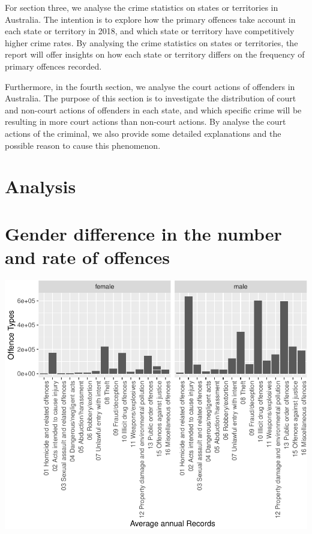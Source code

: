 \documentclass[11pt,a4paper,]{article}
\let\origfigure\figure
\let\endorigfigure\endfigure
\renewenvironment{figure}[1][2] {
\expandafter\origfigure\expandafter[H]
} {
\endorigfigure
}
\begin{document}
For section three, we analyse the crime statistics on states or territories in Australia. The intention is to explore how the primary offences take account in each state or territory in 2018, and which state or territory have competitively higher crime rates. By analysing the crime statistics on states or territories, the report will offer insights on how each state or territory differs on the frequency of primary offences recorded.

Furthermore, in the fourth section, we analyse the court actions of offenders in Australia. The purpose of this section is to investigate the distribution of court and non-court actions of offenders in each state, and which specific crime will be resulting in more court actions than non-court actions. By analyse the court actions of the criminal, we also provide some detailed explanations and the possible reason to cause this phenomenon.

\hypertarget{analysis}{%
\section{Analysis}\label{analysis}}

\section*{Gender difference in the number and rate of offences}

\begin{figure}
\centering
\includegraphics{ETC5513-Assignment4_files/figure-latex/gender1-1.pdf}
\caption{\label{fig:gender1}Yearly average offence records of different offence type}
\end{figure}
\end{document}

